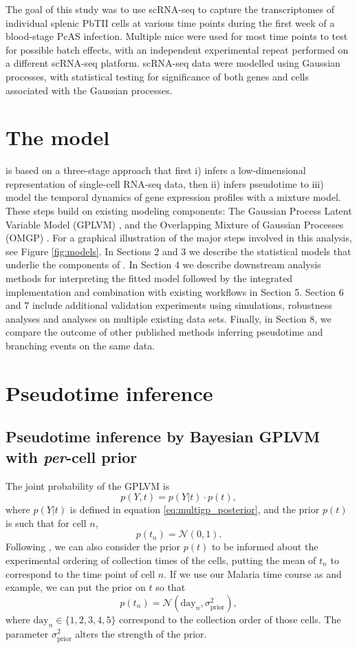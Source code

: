 The goal of this study was to use scRNA-seq to capture the transcriptomes of individual splenic PbTII cells at various time points during the first week of a blood-stage PcAS infection. Multiple mice were used for most time points to test for possible batch effects, with an independent experimental repeat performed on a different scRNA-seq platform. scRNA-seq data were modelled using Gaussian processes, with statistical testing for significance of both genes and cells associated with the Gaussian processes.

\section{The  model}

 is based on a three-stage approach that first i) infers a low-dimensional representation of single-cell RNA-seq data, then ii) infers pseudotime to iii) model the temporal dynamics of gene expression profiles with a mixture model. These steps build on existing modeling components: The Gaussian Process Latent Variable Model (GPLVM) \cite{Lawrence2006-it}, and the Overlapping Mixture of Gaussian Processes (OMGP) \cite{Lazaro-Gredilla2012-ta}. For a graphical illustration of the major steps involved in this analysis, see Figure \ref{fig:models}. In Sections 2 and 3 we describe the statistical models that underlie the components of . In Section 4 we describe downstream analysis methods for interpreting the fitted model followed by the integrated implementation and combination with existing workflows in Section 5. Section 6 and 7 include additional validation experiments using simulations, robustness analyses and analyses on multiple existing data sets. Finally, in Section 8, we compare the outcome of other published methods inferring pseudotime and branching events on the same data.

\section{Pseudotime inference}

\subsection{Pseudotime inference by Bayesian GPLVM with \textit{per}-cell prior}

The joint probability of the GPLVM is
\[ p(Y, t) = p(Y | t) \cdot p(t), \]
where $ p(Y | t) $ is defined in equation \ref{eq:multigp_posterior}, and the prior $ p(t) $ is such that for cell $ n $,
\[ p(t_n) = \mathcal{N}(0, 1). \]
Following \cite{Reid2016-ww}, we can also consider the prior $ p(t) $ to be informed about the experimental ordering of collection times of the cells, putting the mean of $ t_n $ to correspond to the time point of cell $ n $. If we use our Malaria time course as and example, we can put the prior on $ t $ so that
$$ p(t_n) = \mathcal{N}(\text{day}_n, \sigma_\text{prior}^2), $$
where $ \text{day}_n \in \{1, 2, 3, 4, 5 \} $ correspond to the collection order of those cells. The parameter $ \sigma_\text{prior}^2 $ alters the strength of the prior.

